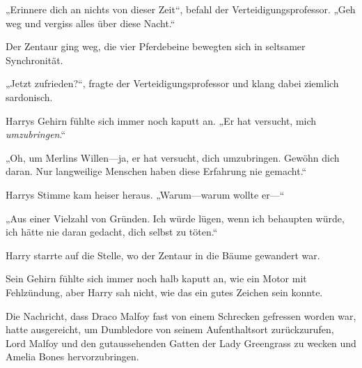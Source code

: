 „Erinnere dich an nichts von dieser Zeit“, befahl der Verteidigungsprofessor.
„Geh weg und vergiss alles über diese Nacht.“

Der Zentaur ging weg, die vier Pferdebeine bewegten sich in seltsamer Synchronität.

„Jetzt zufrieden?“, fragte der Verteidigungsprofessor und klang dabei ziemlich sardonisch.

Harrys Gehirn fühlte sich immer noch kaputt an.
„Er hat versucht, mich \emph{umzubringen}.“

„Oh, um Merlins Willen—ja, er hat versucht, dich umzubringen. Gewöhn dich daran. Nur langweilige Menschen haben diese Erfahrung nie gemacht.“

Harrys Stimme kam heiser heraus.
„Warum—warum wollte er—“

„Aus einer Vielzahl von Gründen. Ich würde lügen, wenn ich behaupten würde, ich hätte nie daran gedacht, dich selbst zu töten.“

Harry starrte auf die Stelle, wo der Zentaur in die Bäume gewandert war.

Sein Gehirn fühlte sich immer noch halb kaputt an, wie ein Motor mit Fehlzündung, aber Harry sah nicht, wie das ein gutes Zeichen sein konnte.

\later

Die Nachricht, dass Draco Malfoy fast von einem Schrecken gefressen worden war, hatte ausgereicht, um Dumbledore von seinem Aufenthaltsort zurückzurufen, Lord Malfoy und den gutaussehenden Gatten der Lady Greengrass zu wecken und Amelia Bones hervorzubringen.

